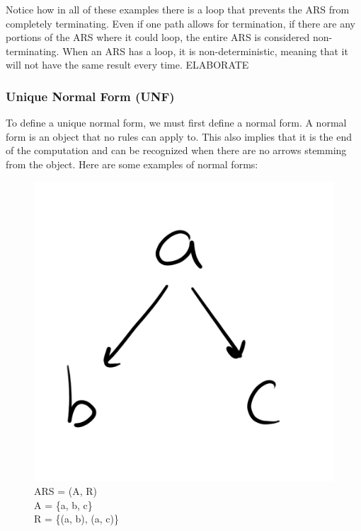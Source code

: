 \documentclass{article}
\begin{document}
{\medskip\noindent
Notice how in all of these examples there is a loop that prevents the ARS from completely terminating. Even if one path allows for termination, if there are any portions of the ARS where it could loop, the entire ARS is considered non-terminating. When an ARS has a loop, it is non-deterministic, meaning that it will not have the same result every time. ELABORATE


\subsubsection{Unique Normal Form (UNF)}

\medskip\noindent
To define a unique normal form, we must first define a normal form. A normal form is an object that no rules can apply to. This also implies that it is the end of the computation and can be recognized when there are no arrows stemming from the object. Here are some examples of normal forms:

\begin{figure}[h!]
  \centering
  \includegraphics[scale=0.06]{gen9}
  \caption[] {
     ARS = (A, R) \\ A = \{a, b, c\} \\ R = \{(a, b), (a, c)\}
    \endtabular}
\end{figure}

}
\end{document}
